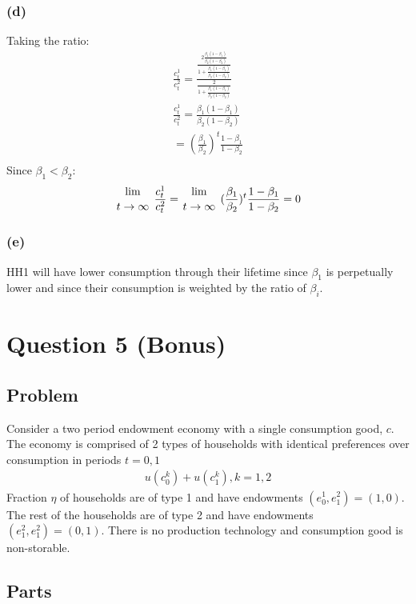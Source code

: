 \documentclass[10pt, a4paper]{article}
\begin{document}
    \subsubsection*{(d)}
      Taking the ratio:
      \begin{gather*}
        \frac{c_t^1}{c_t^2} = \frac{\frac{2\frac{\beta_1(1-\beta_1)}{\beta_2(1-\beta_2)}}{1+\frac{\beta_1(1-\beta_1)}{\beta_2(1-\beta_2)}}}{\frac{2}{1+\frac{\beta_1(1-\beta_1)}{\beta_2(1-\beta_2)}}} \\
        \frac{c_t^1}{c_t^2} = \frac{\beta_1(1-\beta_1)}{\beta_2(1-\beta_2)} \\
        \boxed{= (\frac{\beta_1}{\beta_2})^t\frac{1-\beta_1}{1-\beta_2}} \\
      \end{gather*}
      Since $\beta_1<\beta_2$:
      \begin{gather*}
        {\lim\atop{t\rightarrow\infty}} \ \frac{c_t^1}{c_t^2} = {\lim\atop{t\rightarrow\infty}} \ (\frac{\beta_1}{\beta_2})^t\frac{1-\beta_1}{1-\beta_2} = 0
      \end{gather*}
    \subsubsection*{(e)}
      HH1 will have lower consumption through their lifetime since $\beta_1$ is perpetually lower and since their consumption is weighted by the ratio of $\beta_i$. 
\section*{Question 5 (Bonus)}
  \subsection*{Problem}
    Consider a two period endowment economy with a single consumption good, $c$. The economy is comprised of 2 types of households with identical preferences over consumption in periods $t = 0,1$
    \begin{gather*}
      u(c^k_0) + u(c^k_1), k = 1,2
    \end{gather*}
    Fraction $\eta$ of households are of type 1 and have endowments $(e^1_0, e^2_1) = (1,0)$. The rest of the households are of type 2 and have endowments $(e^2_1, e^2_1) = (0,1)$. There is no production technology and consumption good is non-storable.
  \subsection*{Parts}
\end{document}
